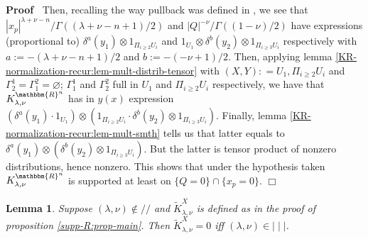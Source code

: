 \documentclass[12pt]{article}
\newcommand{\assign}{:=}
\newcommand{\nin}{\not\in}
\renewenvironment{proof}{\noindent\textbf{Proof\ }}{\hspace*{\fill}$\Box$\medskip}
\newtheorem{lemma}[proposition]{Lemma}
\theoremstyle{remark}
\begin{document}
\begin{proof}
  Then, recalling the way pullback was defined in
  {\cite{hormander1983analysis}}, we see that $| x_p |^{\lambda + \nu - n} /
  \Gamma ((\lambda + \nu - n + 1) / 2)$ and $| Q |^{- \nu} / \Gamma ((1 - \nu)
  / 2)$ have expressions (proportional to) $\delta^a (y_1) \otimes 1_{\Pi_{i
  \geqslant 2} U_i}$ and $1_{U_1} \otimes \delta^b (y_2) \otimes 1_{\Pi_{i
  \geqslant 3} U_i}$ respectively with $a \assign - (\lambda + \nu - n + 1) /
  2$ and $b \assign - (- \nu + 1) / 2$. Then, applying lemma
  \ref{KR-normalization-recur:lem-mult-distrib-tensor} with $(X, Y) : = U_1,
  \Pi_{i \geqslant 2} U_i$ and $\Gamma_2^1 = \Gamma_1^2 = \varnothing$;
  $\Gamma^1_1$ and $\Gamma_2^2$ full in $U_1$ and $\Pi_{i \geqslant 2} U_i$
  respectively, we have that $K_{\lambda, \nu}^{\mathbbm{R}^n}$ has in $y (x)$
  expression $(\delta^a (y_1) \cdot 1_{U_1}) \otimes (1_{\Pi_{i \geqslant 2}
  U_i} \cdot \delta^b (y_2) \otimes 1_{\Pi_{i \geqslant 3} U_i})$. Finally,
  lemma \ref{KR-normalization-recur:lem-mult-smth} tells us that latter equals
  to $\delta^a (y_1) \otimes (\delta^b (y_2) \otimes 1_{\Pi_{i \geqslant 3}
  U_i})$. But the latter is tensor product of nonzero distributions, hence
  nonzero. This shows that under the hypothesis taken $K_{\lambda,
  \nu}^{\mathbbm{R}^n}$ is supported at least on $\{ Q = 0 \} \cap \{ x_p = 0
  \}$.
\end{proof}

\begin{lemma}
  \label{supp-R:lem-Kzero}Suppose $(\lambda, \nu) \nin / /$ and
  $\tilde{K}_{\lambda, \nu}^X$ is defined as in the proof of proposition
  \ref{supp-R:prop-main}. Then $\tilde{K}_{\lambda, \nu}^X = 0$ iff $(\lambda,
  \nu) \in \mid \mid \mid$.
\end{lemma}
\end{document}

